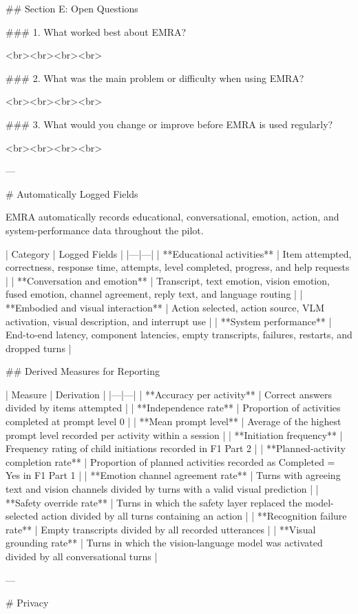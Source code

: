 ## Section E: Open Questions

### 1. What worked best about EMRA?

<br><br><br><br>

### 2. What was the main problem or difficulty when using EMRA?

<br><br><br><br>

### 3. What would you change or improve before EMRA is used regularly?

<br><br><br><br>

---

# Automatically Logged Fields

EMRA automatically records educational, conversational, emotion, action, and system-performance data throughout the pilot.

| Category | Logged Fields |
|---|---|
| **Educational activities** | Item attempted, correctness, response time, attempts, level completed, progress, and help requests |
| **Conversation and emotion** | Transcript, text emotion, vision emotion, fused emotion, channel agreement, reply text, and language routing |
| **Embodied and visual interaction** | Action selected, action source, VLM activation, visual description, and interrupt use |
| **System performance** | End-to-end latency, component latencies, empty transcripts, failures, restarts, and dropped turns |

## Derived Measures for Reporting

| Measure | Derivation |
|---|---|
| **Accuracy per activity** | Correct answers divided by items attempted |
| **Independence rate** | Proportion of activities completed at prompt level 0 |
| **Mean prompt level** | Average of the highest prompt level recorded per activity within a session |
| **Initiation frequency** | Frequency rating of child initiations recorded in F1 Part 2 |
| **Planned-activity completion rate** | Proportion of planned activities recorded as Completed = Yes in F1 Part 1 |
| **Emotion channel agreement rate** | Turns with agreeing text and vision channels divided by turns with a valid visual prediction |
| **Safety override rate** | Turns in which the safety layer replaced the model-selected action divided by all turns containing an action |
| **Recognition failure rate** | Empty transcripts divided by all recorded utterances |
| **Visual grounding rate** | Turns in which the vision-language model was activated divided by all conversational turns |

---

# Privacy

